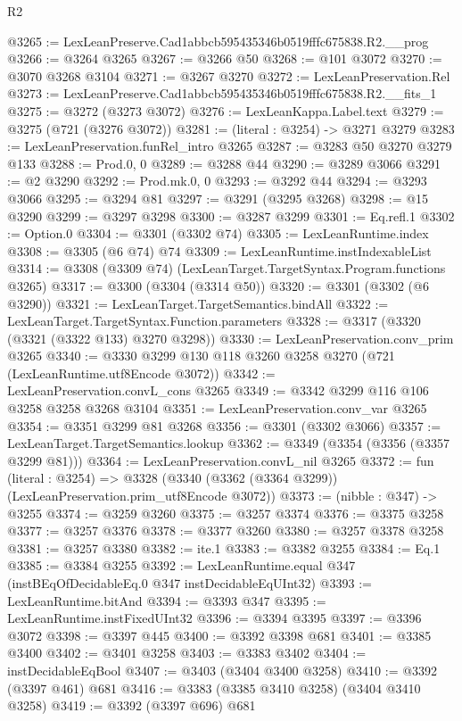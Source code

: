 \begin{lexlean}{R2}
\begin{coremodule}
@3265 := LexLeanPreserve.Cad1abbcb595435346b0519fffc675838.R2.__prog
@3266 := @3264 @3265
@3267 := @3266 @50
@3268 := @101 @3072
@3270 := @3070 @3268 @3104
@3271 := @3267 @3270
@3272 := LexLeanPreservation.Rel
@3273 := LexLeanPreserve.Cad1abbcb595435346b0519fffc675838.R2.__fits_1
@3275 := @3272 (@3273 @3072)
@3276 := LexLeanKappa.Label.text
@3279 := @3275 (@721 (@3276 @3072))
@3281 := (literal : @3254) -> @3271 @3279
@3283 := LexLeanPreservation.funRel_intro @3265
@3287 := @3283 @50 @3270 @3279 @133
@3288 := Prod.{0, 0}
@3289 := @3288 @44
@3290 := @3289 @3066
@3291 := @2 @3290
@3292 := Prod.mk.{0, 0}
@3293 := @3292 @44
@3294 := @3293 @3066
@3295 := @3294 @81
@3297 := @3291 (@3295 @3268)
@3298 := @15 @3290
@3299 := @3297 @3298
@3300 := @3287 @3299
@3301 := Eq.refl.{1}
@3302 := Option.{0}
@3304 := @3301 (@3302 @74)
@3305 := LexLeanRuntime.index
@3308 := @3305 (@6 @74) @74
@3309 := LexLeanRuntime.instIndexableList
@3314 := @3308 (@3309 @74) (LexLeanTarget.TargetSyntax.Program.functions @3265)
@3317 := @3300 (@3304 (@3314 @50))
@3320 := @3301 (@3302 (@6 @3290))
@3321 := LexLeanTarget.TargetSemantics.bindAll
@3322 := LexLeanTarget.TargetSyntax.Function.parameters
@3328 := @3317 (@3320 (@3321 (@3322 @133) @3270 @3298))
@3330 := LexLeanPreservation.conv_prim @3265
@3340 := @3330 @3299 @130 @118 @3260 @3258 @3270 (@721 (LexLeanRuntime.utf8Encode @3072))
@3342 := LexLeanPreservation.convL_cons @3265
@3349 := @3342 @3299 @116 @106 @3258 @3258 @3268 @3104
@3351 := LexLeanPreservation.conv_var @3265
@3354 := @3351 @3299 @81 @3268
@3356 := @3301 (@3302 @3066)
@3357 := LexLeanTarget.TargetSemantics.lookup
@3362 := @3349 (@3354 (@3356 (@3357 @3299 @81)))
@3364 := LexLeanPreservation.convL_nil @3265
@3372 := fun (literal : @3254) =>
  @3328 (@3340 (@3362 (@3364 @3299)) (LexLeanPreservation.prim_utf8Encode @3072))
@3373 := (nibble : @347) -> @3255
@3374 := @3259 @3260
@3375 := @3257 @3374
@3376 := @3375 @3258
@3377 := @3257 @3376
@3378 := @3377 @3260
@3380 := @3257 @3378 @3258
@3381 := @3257 @3380
@3382 := ite.{1}
@3383 := @3382 @3255
@3384 := Eq.{1}
@3385 := @3384 @3255
@3392 := LexLeanRuntime.equal @347 (instBEqOfDecidableEq.{0} @347 instDecidableEqUInt32)
@3393 := LexLeanRuntime.bitAnd
@3394 := @3393 @347
@3395 := LexLeanRuntime.instFixedUInt32
@3396 := @3394 @3395
@3397 := @3396 @3072
@3398 := @3397 @445
@3400 := @3392 @3398 @681
@3401 := @3385 @3400
@3402 := @3401 @3258
@3403 := @3383 @3402
@3404 := instDecidableEqBool
@3407 := @3403 (@3404 @3400 @3258)
@3410 := @3392 (@3397 @461) @681
@3416 := @3383 (@3385 @3410 @3258) (@3404 @3410 @3258)
@3419 := @3392 (@3397 @696) @681

\end{coremodule}
\end{lexlean}
